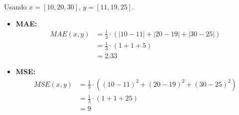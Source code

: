 \documentclass[../main.tex]{subfiles}
\begin{document}
        \begin{example}
            Usando $x = [10, 20, 30]$, $y = [11, 19, 25]$.
            \begin{itemize}
                \item \textbf{MAE:} 
                    \begin{equation}
                        \begin{split}
                            MAE(x, y) &= \frac{1}{3} \cdot (|10-11| + |20-19| + |30-25|) \\
                            &= \frac{1}{3} \cdot (1 + 1 + 5) \\
                            &= 2.33
                        \end{split}
                    \end{equation}
                \item 
                    \textbf{MSE:}
                    \begin{equation}
                        \begin{split}
                            MSE(x, y) &= \frac{1}{3} \cdot ((10-11)^2 + (20-19)^2 + (30-25)^2) \\
                            &= \frac{1}{3} \cdot (1 + 1 + 25) \\
                            &= 9
                        \end{split}
                    \end{equation}
            \end{itemize}
        \end{example}



		          
\end{document}
